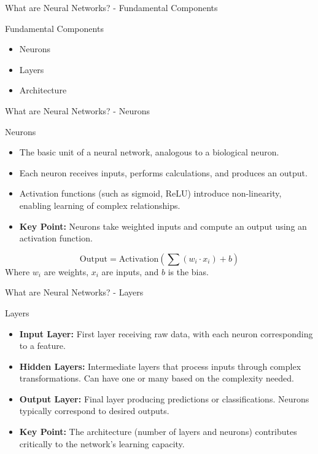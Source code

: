 \documentclass[aspectratio=169]{beamer}
\begin{document}
\begin{frame}[fragile]{What are Neural Networks? - Fundamental Components}
    \begin{block}{Fundamental Components}
        \begin{itemize}
            \item Neurons
            \item Layers
            \item Architecture
        \end{itemize}
    \end{block}
\end{frame}

\begin{frame}[fragile]{What are Neural Networks? - Neurons}
    \begin{block}{Neurons}
        \begin{itemize}
            \item The basic unit of a neural network, analogous to a biological neuron.
            \item Each neuron receives inputs, performs calculations, and produces an output.
            \item Activation functions (such as sigmoid, ReLU) introduce non-linearity, enabling learning of complex relationships.
            \item \textbf{Key Point:} Neurons take weighted inputs and compute an output using an activation function.
        \end{itemize}
    \end{block}
    
    \begin{equation}
        \text{Output} = \text{Activation}\left(\sum (w_i \cdot x_i) + b\right)
    \end{equation}
    Where \( w_i \) are weights, \( x_i \) are inputs, and \( b \) is the bias.
\end{frame}

\begin{frame}[fragile]{What are Neural Networks? - Layers}
    \begin{block}{Layers}
        \begin{itemize}
            \item \textbf{Input Layer:} First layer receiving raw data, with each neuron corresponding to a feature.
            \item \textbf{Hidden Layers:} Intermediate layers that process inputs through complex transformations. Can have one or many based on the complexity needed.
            \item \textbf{Output Layer:} Final layer producing predictions or classifications. Neurons typically correspond to desired outputs.
            \item \textbf{Key Point:} The architecture (number of layers and neurons) contributes critically to the network's learning capacity.
        \end{itemize}
    \end{block}
\end{frame}
\end{document}
